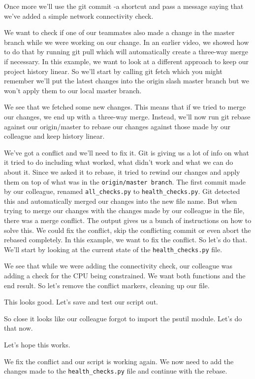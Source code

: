 Once more we'll use the git commit -a shortcut and pass a message saying that we've added a simple network connectivity check.

We want to check if one of our teammates also made a change in the master branch while we were working on our change. In an earlier video, we showed how to do that by running git pull which will automatically create a three-way merge if necessary. In this example, we want to look at a different approach to keep our project history linear. So we'll start by calling git fetch which you might remember we'll put the latest changes into the origin slash master branch but we won't apply them to our local master branch.

We see that we fetched some new changes. This means that if we tried to merge our changes, we end up with a three-way merge. Instead, we'll now run git rebase against our origin/master to rebase our changes against those made by our colleague and keep history linear.

We've got a conflict and we'll need to fix it. Git is giving us a lot of info on what it tried to do including what worked, what didn't work and what we can do about it. Since we asked it to rebase, it tried to rewind our changes and apply them on top of what was in the \verb|origin/master branch|. The first commit made by our colleague, renamed \verb|all_checks.py| to \verb|health_checks.py|. Git detected this and automatically merged our changes into the new file name. But when trying to merge our changes with the changes made by our colleague in the file, there was a merge conflict. The output gives us a bunch of instructions on how to solve this. We could fix the conflict, skip the conflicting commit or even abort the rebased completely. In this example, we want to fix the conflict. So let's do that. We'll start by looking at the current state of the \verb|health_checks.py| file.

We see that while we were adding the connectivity check, our colleague was adding a check for the CPU being constrained. We want both functions and the end result. So let's remove the conflict markers, cleaning up our file.

This looks good. Let's save and test our script out.

So close it looks like our colleague forgot to import the psutil module. Let's do that now.

Let's hope this works.

We fix the conflict and our script is working again. We now need to add the changes made to the \verb|health_checks.py| file and continue with the rebase.


